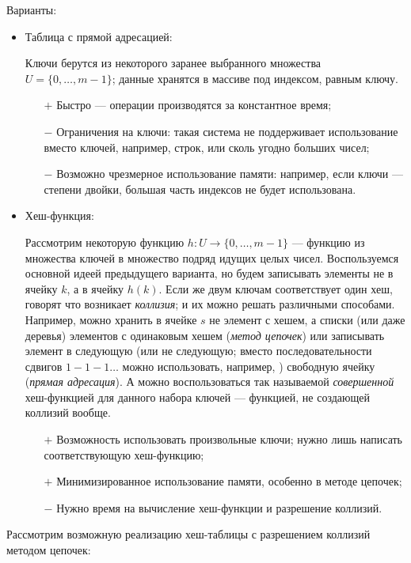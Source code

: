 \documentclass[a4paper,12pt]{article}
\begin{document}
Варианты:

\begin{itemize}
\item
Таблица с прямой адресацией:

Ключи берутся из некоторого заранее выбранного множества $U = \{0,\ldots, m-1\}$; данные хранятся в массиве под индексом, равным ключу.

\begin{itemize}
    \item[$+$]
    Быстро --- операции производятся за константное время;
    \item[$-$]
    Ограничения на ключи: такая система не поддерживает использование вместо ключей, например, строк, или сколь угодно больших чисел;
    \item[$-$]
    Возможно чрезмерное использование памяти: например, если ключи --- степени двойки, большая часть индексов не будет использована.
\end{itemize}

\item
Хеш-функция:

Рассмотрим некоторую функцию $h: U\to \{0, \ldots, m-1\}$ --- функцию из множества ключей в множество подряд идущих целых чисел. Воспользуемся основной идеей предыдущего варианта, но будем записывать элементы не в ячейку $k$, а в ячейку $h(k)$. Если же двум ключам соответствует один хеш, говорят что возникает \emph{коллизия}; и их можно решать различными способами. Например, можно хранить в ячейке $s$ не элемент с хешем, а списки (или даже деревья) элементов с одинаковым хешем (\emph{метод цепочек}) или записывать элемент в следующую (или не следующую; вместо последовательности сдвигов $1-1-1\ldots$ можно использовать, например, ) свободную ячейку (\emph{прямая адресация}). А можно воспользоваться так называемой \emph{совершенной} хеш-функцией для данного набора ключей --- функцией, не создающей коллизий вообще.
\begin{itemize}
    \item[$+$]
    Возможность использовать произвольные ключи; нужно лишь написать соответствующую хеш-функцию;
    \item[$+$]
    Минимизированное использование памяти, особенно в методе цепочек;
    \item[$-$]
    Нужно время на вычисление хеш-функции и разрешение коллизий.
\end{itemize}
\end{itemize}

Рассмотрим возможную реализацию хеш-таблицы с разрешением коллизий методом цепочек:
\end{document}
